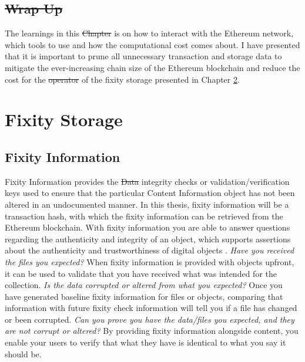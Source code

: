 \documentclass[final]{vutinfth}
\providecommand{\DIFaddtex}[1]{{\protect\color{blue}\uwave{#1}}} %
\providecommand{\DIFdeltex}[1]{{\protect\color{red}\sout{#1}}}                      %
\providecommand{\DIFaddbegin}{} %
\providecommand{\DIFaddend}{} %
\providecommand{\DIFdelbegin}{} %
\providecommand{\DIFdelend}{} %
\providecommand{\DIFadd}[1]{\texorpdfstring{\DIFaddtex{#1}}{#1}} %
\providecommand{\DIFdel}[1]{\texorpdfstring{\DIFdeltex{#1}}{}} %
\begin{document}
\section{\DIFdelbegin \DIFdel{Wrap Up}\DIFdelend \DIFaddbegin \DIFadd{Summary}\DIFaddend }
The learnings in this \DIFdelbegin \DIFdel{Chapter }\DIFdelend \DIFaddbegin \DIFadd{chapter }\DIFaddend is on how to interact with the Ethereum network, which tools to use and how the computational cost comes about. I have presented that it is important to prune all unnecessary transaction and storage data to mitigate the ever-increasing chain size of the Ethereum blockchain and reduce the cost for the \DIFdelbegin \DIFdel{operator }\DIFdelend \DIFaddbegin \DIFadd{user }\DIFaddend of the fixity storage presented in Chapter \ref{ch:fixity-storage}.  \chapter{Fixity Storage}
\label{ch:fixity-storage}
\section{Fixity Information}
Fixity Information provides the \DIFdelbegin \DIFdel{Data }\DIFdelend \DIFaddbegin \DIFadd{data }\DIFaddend integrity checks or validation/verification keys used to ensure that the particular Content Information object has not been altered in an undocumented manner\cite[8]{lee2010open}. In this thesis, fixity information will be a transaction hash, with which the fixity information can be retrieved from the Ethereum blockchain.
With fixity information you are able to answer questions regarding the authenticity and integrity of an object, which supports assertions about the authenticity and trustworthiness of digital objects \cite[3]{ndsa2017fixity}.
\newline \textit{Have you received the files you expected?} When fixity information is provided with objects upfront, it can be used to validate that you have received what was intended for the collection.
\newline \textit{Is the data corrupted or altered from what you expected?}  Once you have generated baseline fixity information for files or objects, comparing that information with future fixity check information will tell you if a file has changed or been corrupted.
\newline \textit{Can you prove you have the data/files you expected, and they are not corrupt or altered?} By providing fixity information alongside content, you enable your users to verify that what they have is identical to what you say it should be. 
\end{document}
